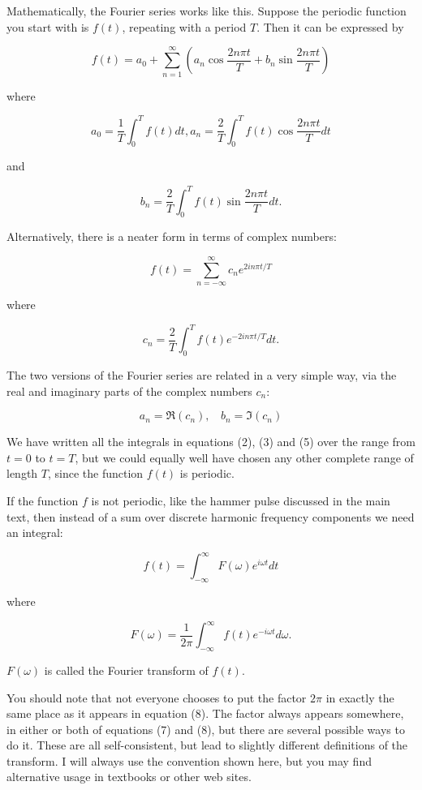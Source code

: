   Mathematically, the Fourier series works like this. Suppose the periodic 
  function you start with is $f(t)$, repeating with a period $T$. Then it can 
  be expressed by 

  $$f(t)=a_0+\sum_{n=1}^\infty \left( a_n \cos \dfrac{2n\pi t}{T} + b_n \sin 
  \dfrac{2n\pi t}{T} \right) \tag{1}$$ 

  where 

  $$a_0=\dfrac{1}{T}\int_0^T f(t) dt, a_n=\dfrac{2}{T}\int_0^T f(t)\cos 
  \dfrac{2n\pi t}{T} dt \tag{2}$$ 

  and 

  $$b_n=\dfrac{2}{T}\int_0^T f(t)\sin \dfrac{2n\pi t}{T} dt. \tag{3}$$ 

  Alternatively, there is a neater form in terms of complex numbers: 

  $$f(t)=\sum_{n=-\infty}^\infty c_n e^{2in\pi t/T} \tag{4}$$ 

  where 

  $$c_n=\dfrac{2}{T}\int_0^T f(t)e^{-2in\pi t/T} dt. \tag{5}$$ 

  The two versions of the Fourier series are related in a very simple way, via 
  the real and imaginary parts of the complex numbers $c_n$: 

  $$a_n=\Re (c_n), \mathrm{~~~~}b_n=\Im (c_n) \tag{6}$$ 

  We have written all the integrals in equations (2), (3) and (5) over the 
  range from $t=0$ to $t=T$, but we could equally well have chosen any other 
  complete range of length $T$, since the function $f(t)$ is periodic. 

  If the function $f$ is not periodic, like the hammer pulse discussed in the 
  main text, then instead of a sum over discrete harmonic frequency components 
  we need an integral: 

  $$f(t)=\int_{-\infty}^\infty F(\omega) e^{i \omega t} dt \tag{7}$$ 

  where 

  $$F(\omega)=\dfrac{1}{2\pi}\int_{-\infty}^\infty f(t) e^{-i \omega t} 
  d\omega. \tag{8}$$ 

  $F(\omega)$ is called the Fourier transform of $f(t)$. 

  You should note that not everyone chooses to put the factor $2 \pi$ in 
  exactly the same place as it appears in equation (8). The factor always 
  appears somewhere, in either or both of equations (7) and (8), but there are 
  several possible ways to do it. These are all self-consistent, but lead to 
  slightly different definitions of the transform. I will always use the 
  convention shown here, but you may find alternative usage in textbooks or 
  other web sites. 

